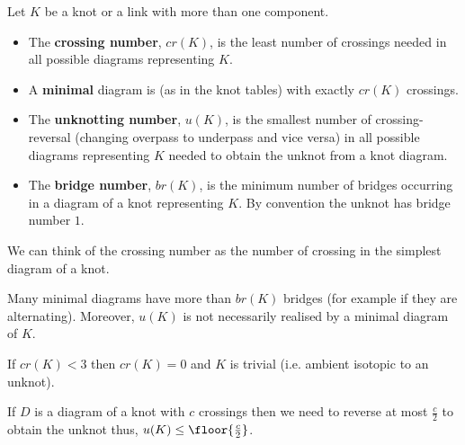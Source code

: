 \documentclass[12pt, a4paper]{article}
\begin{document}
\begin{definition}
    Let \(K\) be a knot or a link with more than one component.
    \begin{itemize}
        \item The \textbf{crossing number}, \(cr(K)\), is the least number of crossings needed in all possible diagrams representing \(K\). 
        \item A \textbf{minimal} diagram is (as in the knot tables) with exactly \(cr(K)\) crossings.
        \item The \textbf{unknotting number}, \(u(K)\), is the smallest number of crossing-reversal (changing overpass to underpass and vice versa) in all possible diagrams representing \(K\) needed to obtain the unknot from a knot diagram.
        \item The \textbf{bridge number}, \(br(K)\), is the minimum number of bridges occurring in a diagram of a knot representing \(K\). By convention the unknot has bridge number \(1\).
    \end{itemize}
\end{definition}

\begin{mdnote}
    We can think of the crossing number as the number of crossing in the simplest diagram of a knot.
\end{mdnote}

\begin{mdremark}
    Many minimal diagrams have more than \(br(K)\) bridges (for example if they are alternating). Moreover, \(u(K)\) is not necessarily realised by a minimal diagram of \(K\).
\end{mdremark}

\begin{proposition}
    If \(cr(K)<3\) then \(cr(K)=0\) and \(K\) is trivial (i.e. ambient isotopic to an unknot).
\end{proposition}

\begin{mdlemma}
    If \(D\) is a diagram of a knot with \(c\) crossings then we need to reverse at most \(\frac{c}{2}\) to obtain the unknot thus, \(u(K) \leq \floor{\frac{c}{2}}\).
\end{mdlemma}
\end{document}
